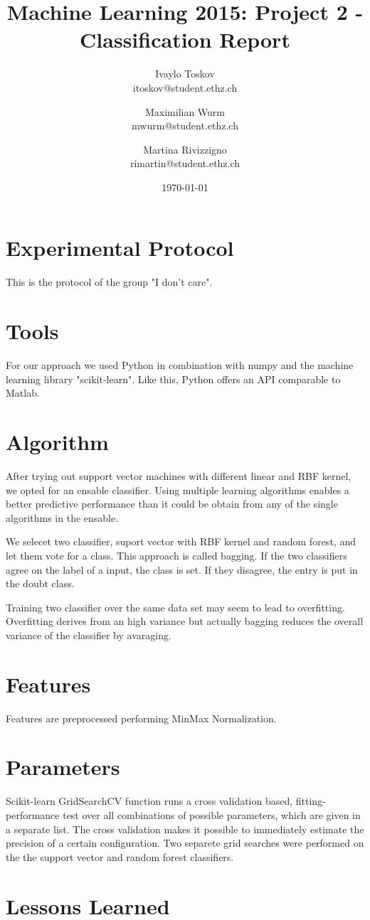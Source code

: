 \documentclass[a4paper, 11pt]{article}
\title{Machine Learning 2015: Project 2 - Classification Report}
\author{Ivaylo Toskov \\ itoskov@student.ethz.ch \and Maximilian Wurm \\ mwurm@student.ethz.ch \and 
	Martina Rivizzigno \\ rimartin@student.ethz.ch\\}
\date{\today}
\begin{document}
\maketitle

\section*{Experimental Protocol}
This is the protocol of the group "I don't care".

\section{Tools}
For our approach we used Python in combination with numpy and the machine learning library "scikit-learn". Like this, Python offers an API comparable to Matlab.

\section{Algorithm}
After trying out support vector machines with different linear and RBF kernel, we opted for an ensable classifier. Using multiple learning algorithms enables a better predictive performance than it could be obtain from any of the single algorithms in the ensable.

We selecet two classifier, suport vector with RBF kernel and random forest, and let them vote for a class. This approach is called bagging. If the two classifiers agree on the label of a input, the class is set. If they disagree, the entry is put in the doubt class.

Training two classifier over the same data set may seem to lead to overfitting. Overfitting derives from an high variance but actually bagging reduces the overall variance of the classifier by avaraging. 

\section{Features}
Features are preprocessed performing MinMax Normalization. 

\section{Parameters}
Scikit-learn GridSearchCV function runs a cross validation based, fitting-performance test over all combinations of possible parameters, which are given in a separate list. The cross validation makes it possible to immediately estimate the precision of a certain configuration. Two separete grid searches were performed on the the support vector and random forest classifiers. 

\section{Lessons Learned} 
\end{document}
